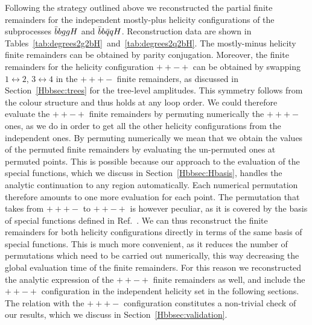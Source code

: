 \documentclass[main.tex]{subfiles}
\begin{document}
Following the strategy outlined above we reconstructed the partial finite remainders for the independent mostly-plus helicity configurations of the subprocesses $\bar{b}bggH$ and $\bar{b}b\bar{q}qH$. Reconstruction data are shown in Tables~\ref{tab:degrees2g2bH}~and~\ref{tab:degrees2q2bH}. The mostly-minus helicity finite remainders can be obtained by parity conjugation. Moreover, the finite remainders for the helicity configuration $++-+$ can be obtained by swapping $1\leftrightarrow2$, $3\leftrightarrow 4$ in the $+++-$ finite remainders, as discussed in Section~\ref{Hbbsec:trees} for the tree-level amplitudes. 
This symmetry follows from the colour structure and thus holds at any loop order. 
We could therefore evaluate the $++-+$ finite remainders by permuting numerically the $+++-$ ones, as we do in order to get all the other helicity configurations from the independent ones. By permuting numerically we mean that we obtain the values of the permuted finite remainders by evaluating the un-permuted ones at permuted points. This is possible because our approach to the evaluation of the special functions, which we discuss in Section~\ref{Hbbsec:Hbasis}, handles the analytic continuation to any region automatically. Each numerical permutation therefore amounts to one more evaluation for each point. The permutation that takes from $+++-$ to $++-+$ is however peculiar, as it is covered by the basis of special functions defined in Ref.~\cite{Badger:2021nhg}. We can thus reconstruct the finite remainders for both helicity configurations directly in terms of the same basis of special functions. This is much more convenient, as it reduces the number of permutations which need to be carried out numerically, this way decreasing the global evaluation time of the finite remainders. For this reason we reconstructed the analytic expression of the $++-+$ finite remainders as well, and include the $++-+$ configuration in the independent helicity set in the following sections. 
The relation with the $+++-$ configuration constitutes a non-trivial check of our results, which we discuss in Section~\ref{Hbbsec:validation}.
\end{document}
